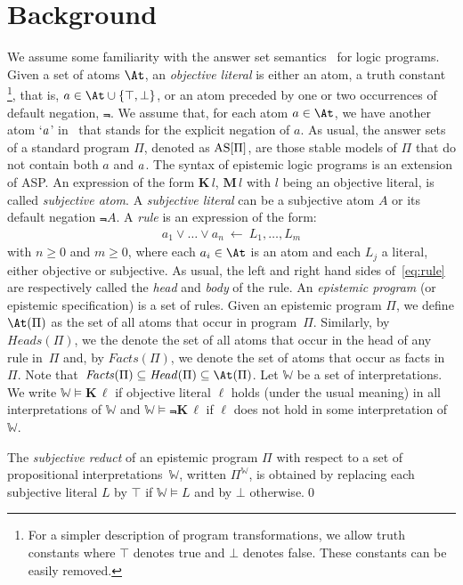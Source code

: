 \documentclass{new_tlp}
\def\K{\mathbf{K}\, }
\def\M{\mathbf{M}\, }
\let\sneg\relax
\newcommand{\sneg}{\ensuremath{\text{-}}}
\def\AS{\text{\rm AS}}
\newcommand\wv{\mathbb{W}}
\def\Head{\mathit{Head}}
\def\bL{\K}
\def\Facts{\mathit{Facts}}
\def\Heads{\mathit{Heads}}
\begin{document}
\section{Background}
\label{sec:background}
We assume some familiarity with the answer set semantics~\cite{GL91} for logic programs.
%
Given a set of atoms $\At$, an \emph{objective literal} is either an atom, a truth constant%
\footnote{For a simpler description of program transformations, we allow truth constants where $\top$ denotes true and $\bot$ denotes false.
  These constants can be easily removed.},
that is, \mbox{$a \in \At \cup \{\top,\bot\}$}, or an atom preceded by one or two occurrences of default negation, $\Not$.
%
We assume that, for each atom $a \in \At$, we have another atom `$\sneg a$' in \At\ that stands for the explicit negation of $a$.
%
As usual, the answer sets of a standard program $\Pi$, denoted as $\AS[\Pi]$, are those stable models of $\Pi$ that do not contain both $a$ and $\sneg a$.
%
The syntax of epistemic logic programs is an extension of ASP.
%
An expression of the form $\K l$, $\M l$ with $l$ being an objective literal, is called \emph{subjective atom}.
%
A \emph{subjective literal} can be a subjective atom $A$ or its default negation $\Not A$.
%
A \emph{rule} is an expression of the form:
\begin{gather}
a_1 \vee \dots \vee a_n \ \leftarrow \ L_1, \dots, L_m
	\label{eq:rule}
\end{gather}
with $n\geq 0$ and $m\geq 0$, where each $a_i \in \At$ is an atom and each $L_j$ a literal, either objective or subjective.
%
As usual, the left and right hand sides of~\eqref{eq:rule} are respectively called the \emph{head} and \emph{body} of the rule.
%
An \emph{epistemic program} (or epistemic specification) is a set of rules.
%
Given an epistemic program $\Pi$, we define $\At(\Pi)$ as the set of all atoms that occur in program~$\Pi$.
%
Similarly, by~$\Heads(\Pi)$, we the denote the set of all atoms that occur in the head of any rule in~$\Pi$ and, by $\Facts(\Pi)$, we denote the set of atoms that occur as facts in~$\Pi$.
%
Note that~$\Facts(\Pi) \subseteq \Head(\Pi) \subseteq \At(\Pi)$.
%
Let $\wv$ be a set of interpretations.
We write $\wv \models \bL \ell$ if objective literal $\ell$ holds (under the usual meaning) in all interpretations of $\wv$ and $\wv \models \Not \bL \ell$ if $\ell$ does not hold in some interpretation of~$\wv$.

\begin{definition}
The \emph{subjective reduct} of an epistemic program $\Pi$ with respect to a set of propositional interpretations~$\wv$, written $\Pi^\wv$, is
obtained by replacing each subjective literal $L$ by $\top$ if $\wv \models L$ and by $\bot$ otherwise.\qed
\end{definition}
\end{document}

